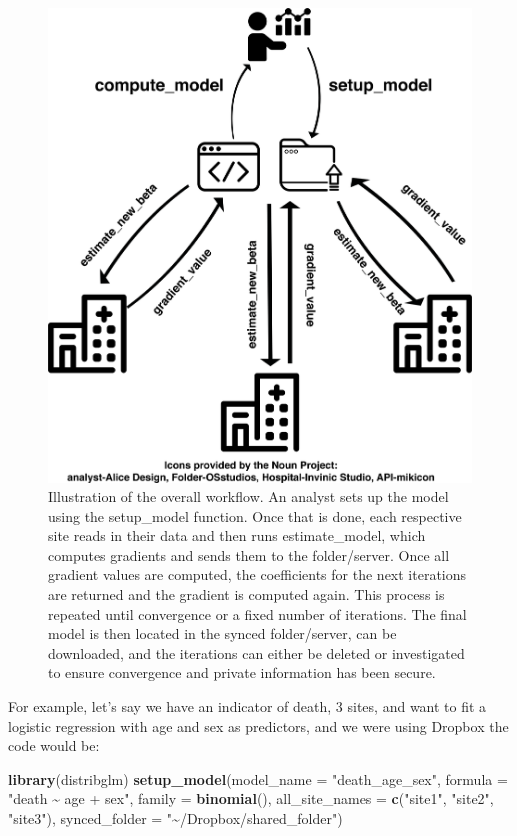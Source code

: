 \documentclass[]{elsarticle} %
\makeatletter
\newenvironment{Shaded}{\begin{snugshade}}{\end{snugshade}}
\newcommand{\DataTypeTok}[1]{\textcolor[rgb]{0.13,0.29,0.53}{#1}}
\newcommand{\KeywordTok}[1]{\textcolor[rgb]{0.13,0.29,0.53}{\textbf{#1}}}
\newcommand{\NormalTok}[1]{#1}
\newcommand{\StringTok}[1]{\textcolor[rgb]{0.31,0.60,0.02}{#1}}
\def\maxwidth{\ifdim\Gin@nat@width>\linewidth\linewidth
\else\Gin@nat@width\fi}
\let\Oldincludegraphics\includegraphics
\renewcommand{\includegraphics}[1]{\Oldincludegraphics[width=\maxwidth]{#1}}
\makeatother
\begin{document}
\begin{figure}
\centering
\includegraphics{workflow.png}
\caption{\label{fig:workflow}Illustration of the overall workflow. An analyst sets up the model using the setup\_model function. Once that is done, each respective site reads in their data and then runs estimate\_model, which computes gradients and sends them to the folder/server. Once all gradient values are computed, the coefficients for the next iterations are returned and the gradient is computed again. This process is repeated until convergence or a fixed number of iterations. The final model is then located in the synced folder/server, can be downloaded, and the iterations can either be deleted or investigated to ensure convergence and private information has been secure.}
\end{figure}

For example, let's say we have an indicator of death, 3 sites, and want to fit a logistic regression with age and sex as predictors, and we were using Dropbox the code would be:

\begin{Shaded}
\begin{Highlighting}[]
\KeywordTok{library}\NormalTok{(distribglm)}
\KeywordTok{setup\_model}\NormalTok{(}\DataTypeTok{model\_name =} \StringTok{"death\_age\_sex"}\NormalTok{, }
            \DataTypeTok{formula =} \StringTok{"death \textasciitilde{} age + sex"}\NormalTok{, }
            \DataTypeTok{family =} \KeywordTok{binomial}\NormalTok{(), }
            \DataTypeTok{all\_site\_names =} \KeywordTok{c}\NormalTok{(}\StringTok{"site1"}\NormalTok{, }\StringTok{"site2"}\NormalTok{, }\StringTok{"site3"}\NormalTok{),}
            \DataTypeTok{synced\_folder =} \StringTok{"\textasciitilde{}/Dropbox/shared\_folder"}\NormalTok{)}
\end{Highlighting}
\end{Shaded}
\end{document}
